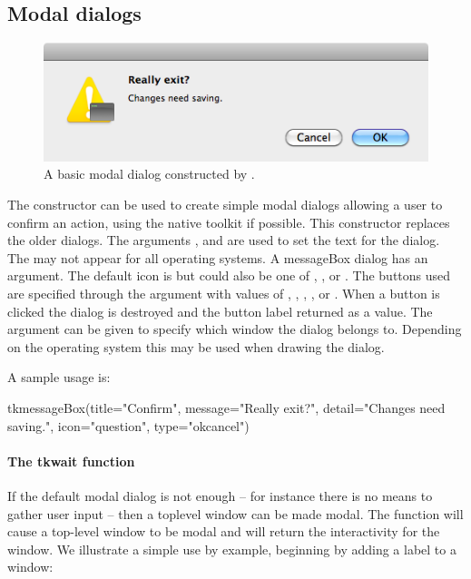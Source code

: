 \subsection{Modal dialogs}
\label{sec:modal-dialogs}

\begin{figure}
  \centering
  \includegraphics[width=.6\textwidth]{fig-tcltk-confirm-dialog.png}
  \caption{A basic modal dialog constructed by .}
  \label{fig:fig-tcltk-confirm-dialog}
\end{figure}

The  constructor can be used to create
simple modal dialogs allowing a user to confirm an action, using the
native toolkit if possible. This constructor replaces the older
 dialogs. The arguments ,
 and 
are used to set the text for the dialog. The  may not
appear for all operating systems. A messageBox dialog has an
 argument. The default icon is
 but could also be one of , ,
or . The buttons used are specified through the
 argument with values of ,
, , , or
. When a button is clicked the dialog is destroyed
and the button label returned as a value. The argument
 can be given to specify which window
the dialog belongs to. Depending on the operating system this may be
used when drawing the dialog.

A sample usage is:
\begin{Schunk}
\begin{Sinput}
 tkmessageBox(title="Confirm", message="Really exit?", 
              detail="Changes need saving.", 
              icon="question", type="okcancel")
\end{Sinput}
\end{Schunk}

\paragraph{The tkwait function}
If the default modal dialog is not enough -- for instance there is no
means to gather user input -- then a toplevel window can be made
modal. The  function will cause a top-level window to
be modal and  will return the interactivity
for the window. We illustrate a simple use by example, beginning by
adding a label to a window:

